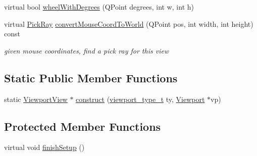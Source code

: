 \begin{DoxyCompactItemize}
\item 
virtual bool \hyperlink{classShipCAD_1_1ViewportView_a77ce1c6a0216a791ee2ae79dd6674cde}{wheel\-With\-Degrees} (Q\-Point degrees, int w, int h)
\item 
virtual \hyperlink{structShipCAD_1_1PickRay}{Pick\-Ray} \hyperlink{classShipCAD_1_1ViewportView_a845fc1fe9fa6ec52726fba1ad350e638}{convert\-Mouse\-Coord\-To\-World} (Q\-Point pos, int width, int height) const 
\begin{DoxyCompactList}\small\item\em given mouse coordinates, find a pick ray for this view \end{DoxyCompactList}\end{DoxyCompactItemize}
\subsection*{Static Public Member Functions}
\begin{DoxyCompactItemize}
\item 
static \hyperlink{classShipCAD_1_1ViewportView}{Viewport\-View} $\ast$ \hyperlink{classShipCAD_1_1ViewportView_aec2ef49c2d2ecf9099dfbf32cd645144}{construct} (\hyperlink{namespaceShipCAD_aeeeb05810f2e31ef89fd4ac6b6ba9c0a}{viewport\-\_\-type\-\_\-t} ty, \hyperlink{classShipCAD_1_1Viewport}{Viewport} $\ast$vp)
\end{DoxyCompactItemize}
\subsection*{Protected Member Functions}
\begin{DoxyCompactItemize}
\item 
virtual void \hyperlink{classShipCAD_1_1ViewportView_a15b8dab8f55b9967feeb7b93c234053d}{finish\-Setup} ()
\end{DoxyCompactItemize}
